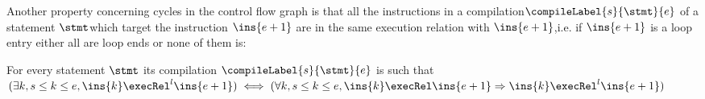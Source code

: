 Another property concerning cycles in the control flow graph is that all the instructions in a compilation$\compileLabel{s}{\stmt}{e}$   of a statement $\stmt 
$which target the instruction $\ins{e+1}$  are in the same execution relation with  $\ins{e+1}$,i.e. if  
$\ins{e+1}$ is a  loop entry either all are loop ends or none of them is:
\begin{compProp5}\label{compile:prop:compProp5} 
 For every statement $\stmt$ its compilation $\compileLabel{s}{\stmt}{e}$ is such that 
$(\exists k, s \le k \le e, \ins{k} \execRel^{l} \ins{e+1} ) \iff (\forall k, s \le k \le e, \ins{k} \execRel \ins{e+1}  \Rightarrow \ins{k} \execRel^{l} \ins{e+1} ) $
\end{compProp5}















 
